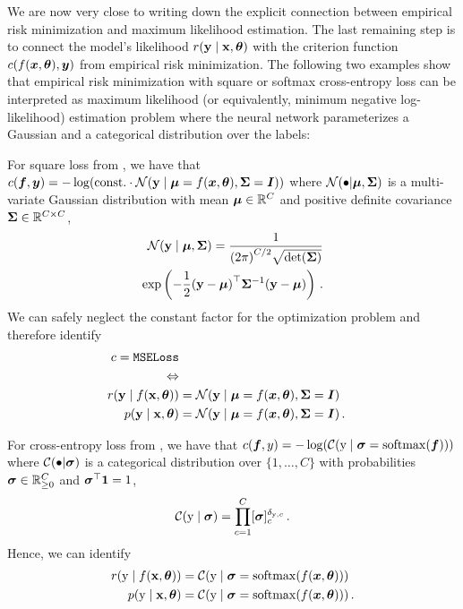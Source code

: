 We are now very close to writing down the explicit connection between empirical risk minimization and maximum likelihood estimation.
The last remaining step is to connect the model's likelihood $r({\mathbf{y}} \mid {\mathbf{x}}, {\bm{\theta}})$ with the criterion function $c(f({\bm{x}}, {\bm{\theta}}), {\bm{y}})$ from empirical risk minimization.
The following two examples show that empirical risk minimization with square or softmax cross-entropy loss can be interpreted as maximum likelihood (or equivalently, minimum negative log-likelihood) estimation problem where the neural network parameterizes a Gaussian and a categorical distribution over the labels:

\begin{example}
  For square loss from , we have that $c({\bm{f}}, {\bm{y}}) = - \log( \mathrm{const.}
  \cdot {\mathcal{N}}({\mathbf{y}} \mid {\bm{\mu}} = f({\bm{x}}, {\bm{\theta}}), {\bm{\Sigma}} = {\bm{I}}))$ where ${\mathcal{N}}(\bullet | {\bm{\mu}}, {\bm{\Sigma}})$ is a multi-variate Gaussian distribution with mean ${\bm{\mu}} \in {\mathbb{R}}^C$ and positive definite covariance ${\bm{\Sigma}} \in {\mathbb{R}}^{C \times C}$,
  \begin{align*}
    {\mathcal{N}}({\mathbf{y}} \mid {\bm{\mu}}, {\bm{\Sigma}})
    =
    \frac{1}{{(2\pi)}^{C/2} \sqrt{\det({\bm{\Sigma}})}}
    \\
    \exp\left( -\frac{1}{2} {({\mathbf{y}} - {\bm{\mu}})}^\top {\bm{\Sigma}}^{-1} ({\mathbf{y}} - {\bm{\mu}}) \right)\,.
  \end{align*}
  We can safely neglect the constant factor for the optimization problem and therefore identify
  \begin{align*}
    c = \text{\texttt{MSELoss}}
    \\
    \Leftrightarrow
    \\
    r({\mathbf{y}} \mid f({\mathbf{x}}, {\bm{\theta}})) &= {\mathcal{N}}({\mathbf{y}} \mid {\bm{\mu}} = f({\bm{x}}, {\bm{\theta}}), {\bm{\Sigma}} = {\bm{I}})\,
    \\
    p({\mathbf{y}} \mid {\mathbf{x}}, {\bm{\theta}}) &= {\mathcal{N}}({\mathbf{y}} \mid {\bm{\mu}} = f({\bm{x}}, {\bm{\theta}}), {\bm{\Sigma}} = {\bm{I}})\,.
  \end{align*}
\end{example}

\begin{example}
  For cross-entropy loss from , we have that $c({\bm{f}}, y) = - \log( {\mathcal{C}}({\textnormal{y}} \mid {\bm{\sigma}} = \mathrm{softmax}({\bm{f}}) ))$ where ${\mathcal{C}}(\bullet | {\bm{\sigma}})$ is a categorical distribution over $\{1, \dots, C\}$ with probabilities ${\bm{\sigma}} \in {\mathbb{R}}^C_{\ge 0}$ and ${\bm{\sigma}}^\top {\bm{1}} = 1$,
  \begin{align*}
    {\mathcal{C}}({\textnormal{y}} \mid {\bm{\sigma}})
    =
    \prod_{c=1}^C [{\bm{\sigma}}]_c^{\delta_{{\textnormal{y}},c}}\,.
  \end{align*}
  Hence, we can identify
  \begin{align*}
    r({\textnormal{y}} \mid f({\mathbf{x}}, {\bm{\theta}})) &= {\mathcal{C}}({\textnormal{y}} \mid {\bm{\sigma}} = \mathrm{softmax}(f({\bm{x}}, {\bm{\theta}})))\,
    \\
    p({\textnormal{y}} \mid {\mathbf{x}}, {\bm{\theta}}) &= {\mathcal{C}}({\textnormal{y}} \mid {\bm{\sigma}} = \mathrm{softmax}(f({\bm{x}}, {\bm{\theta}})))\,.
  \end{align*}
\end{example}
